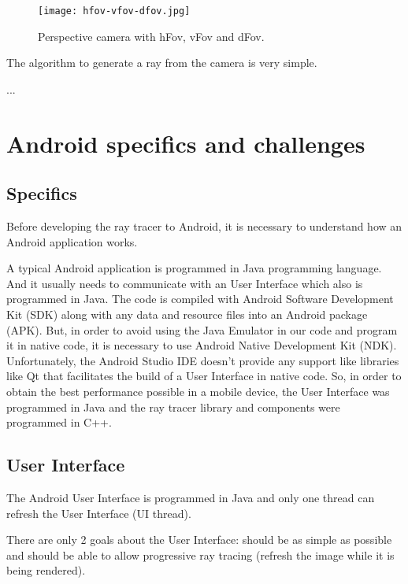 \begin{figure}[H]
	\centering
	\caption{Perspective camera with hFov, vFov and dFov.}
	\label{Perspective_Camera.}
	\texttt{[image: hfov-vfov-dfov.jpg]}
\end{figure}

\par
The algorithm to generate a ray from the camera is very simple.

...

\section{Android specifics and challenges}

\subsection{Specifics}

\par
Before developing the ray tracer to Android, it is necessary to understand how an Android application works.

\par
A typical Android application is programmed in Java programming language.
And it usually needs to communicate with an User Interface which also is programmed in Java.
The code is compiled with Android Software Development Kit (SDK) along with any data and resource files into an Android package (APK).
But, in order to avoid using the Java Emulator in our code and program it in native code, it is necessary to use Android Native Development Kit (NDK).
Unfortunately, the Android Studio IDE doesn't provide any support like libraries like Qt that facilitates the build of a User Interface in native code.
So, in order to obtain the best performance possible in a mobile device, the User Interface was programmed in Java and the ray tracer library and components were programmed in C++.

\subsection{User Interface}

\par
The Android User Interface is programmed in Java and only one thread can refresh the User Interface (UI thread).

\par
There are only 2 goals about the User Interface: should be as simple as possible and should be able to allow progressive ray tracing (refresh the image while it is being rendered).

